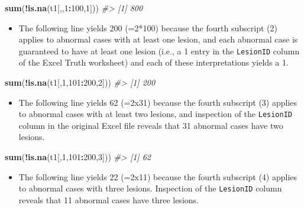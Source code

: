 \documentclass[]{book}
\newenvironment{Shaded}{\begin{snugshade}}{\end{snugshade}}
\newcommand{\CommentTok}[1]{\textcolor[rgb]{0.56,0.35,0.01}{\textit{#1}}}
\newcommand{\DecValTok}[1]{\textcolor[rgb]{0.00,0.00,0.81}{#1}}
\newcommand{\KeywordTok}[1]{\textcolor[rgb]{0.13,0.29,0.53}{\textbf{#1}}}
\newcommand{\NormalTok}[1]{#1}
\newcommand{\OperatorTok}[1]{\textcolor[rgb]{0.81,0.36,0.00}{\textbf{#1}}}
\providecommand{\tightlist}{%
  \setlength{\itemsep}{0pt}\setlength{\parskip}{0pt}}
\begin{document}
\begin{Shaded}
\begin{Highlighting}[]
\KeywordTok{sum}\NormalTok{(}\OperatorTok{!}\KeywordTok{is.na}\NormalTok{(t1[,,}\DecValTok{1}\OperatorTok{:}\DecValTok{100}\NormalTok{,}\DecValTok{1}\NormalTok{]))}
\CommentTok{#> [1] 800}
\end{Highlighting}
\end{Shaded}

\begin{itemize}
\tightlist
\item
  The following line yields 200 (=2*100) because the fourth subscript (2) applies to abnormal cases with at least one lesion, and each abnormal case is guaranteed to have at least one lesion (i.e., a 1 entry in the \texttt{LesionID} column of the Excel Truth worksheet) and each of these interpretations yields a 1.
\end{itemize}

\begin{Shaded}
\begin{Highlighting}[]
\KeywordTok{sum}\NormalTok{(}\OperatorTok{!}\KeywordTok{is.na}\NormalTok{(t1[,}\DecValTok{1}\NormalTok{,}\DecValTok{101}\OperatorTok{:}\DecValTok{200}\NormalTok{,}\DecValTok{2}\NormalTok{]))}
\CommentTok{#> [1] 200}
\end{Highlighting}
\end{Shaded}

\begin{itemize}
\tightlist
\item
  The following line yields 62 (=2x31) because the fourth subscript (3) applies to abnormal cases with at least two lesions, and inspection of the \texttt{LesionID} column in the original Excel file reveals that 31 abnormal cases have two lesions.
\end{itemize}

\begin{Shaded}
\begin{Highlighting}[]
\KeywordTok{sum}\NormalTok{(}\OperatorTok{!}\KeywordTok{is.na}\NormalTok{(t1[,}\DecValTok{1}\NormalTok{,}\DecValTok{101}\OperatorTok{:}\DecValTok{200}\NormalTok{,}\DecValTok{3}\NormalTok{]))}
\CommentTok{#> [1] 62}
\end{Highlighting}
\end{Shaded}

\begin{itemize}
\tightlist
\item
  The following line yields 22 (=2x11) because the fourth subscript (4) applies to abnormal cases with three lesions. Inspection of the \texttt{LesionID} column reveals that 11 abnormal cases have three lesions.
\end{itemize}
\end{document}

